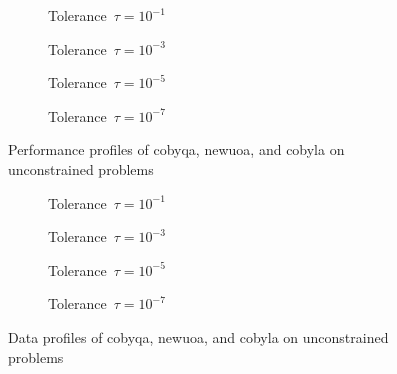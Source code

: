 \begin{figure}[ht]
    \centering
    \begin{subfigure}[b]{0.49\textwidth}
        \centering
        \caption{Tolerance~$\tau = 10^{-1}$}
    \end{subfigure}
    \hfill
    \begin{subfigure}[b]{0.49\textwidth}
        \centering
        \caption{Tolerance~$\tau = 10^{-3}$}
    \end{subfigure}
    \begin{subfigure}[b]{0.49\textwidth}
        \centering
        \caption{Tolerance~$\tau = 10^{-5}$}
    \end{subfigure}
    \hfill
    \begin{subfigure}[b]{0.49\textwidth}
        \centering
        \caption{Tolerance~$\tau = 10^{-7}$}
    \end{subfigure}
    \caption[Performance profiles on unconstrained problems]{Performance profiles of \gls{cobyqa}, \gls{newuoa}, and \gls{cobyla} on unconstrained problems}
    \label{fig:perf-unconstrained-problems}
\end{figure}

\begin{figure}[ht]
    \centering
    \begin{subfigure}[b]{0.49\textwidth}
        \centering
        \caption{Tolerance~$\tau = 10^{-1}$}
    \end{subfigure}
    \hfill
    \begin{subfigure}[b]{0.49\textwidth}
        \centering
        \caption{Tolerance~$\tau = 10^{-3}$}
    \end{subfigure}
    \begin{subfigure}[b]{0.49\textwidth}
        \centering
        \caption{Tolerance~$\tau = 10^{-5}$}
    \end{subfigure}
    \hfill
    \begin{subfigure}[b]{0.49\textwidth}
        \centering
        \caption{Tolerance~$\tau = 10^{-7}$}
    \end{subfigure}
    \caption[Data profiles on unconstrained problems]{Data profiles of \gls{cobyqa}, \gls{newuoa}, and \gls{cobyla} on unconstrained problems}
    \label{fig:data-unconstrained-problems}
\end{figure}

